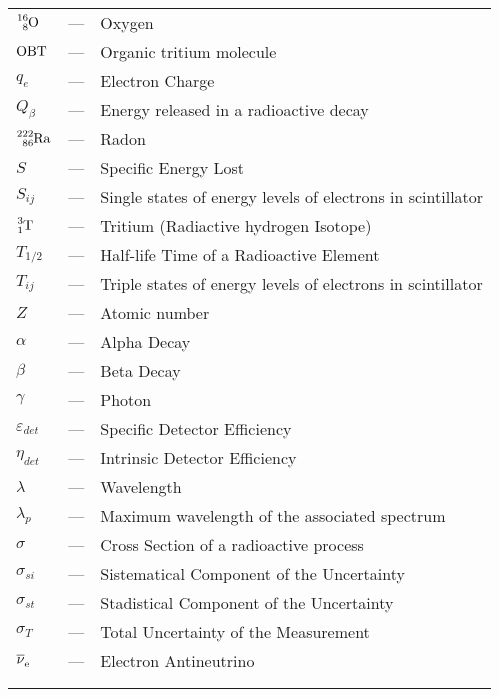 \begin{longtable}{p{25mm} c p{120mm} }
$\ce{^{16}_{8}O}$ & --- & Oxygen\\
$\ce{OBT}$ & --- & Organic tritium molecule\\
$q_{e}$ & --- & Electron Charge\\
$Q_\beta$ & --- & Energy released in a radioactive decay\\
$\ce{^{222}_{86}Ra}$ & --- & Radon\\
$S$ & --- & Specific Energy Lost\\
$S_{ij}$ & --- & Single states of energy levels of electrons in scintillator\\
$\ce{^{3}_{1}T}$ & --- & Tritium (Radiactive hydrogen Isotope)\\
$T_{1/2}$ & --- & Half-life Time of a Radioactive Element\\
$T_{ij}$ & --- & Triple states of energy levels of electrons in scintillator\\
$Z$ & --- & Atomic number\\
$\alpha$ & --- & Alpha Decay\\
$\beta$ & --- & Beta Decay\\
$\gamma$ & --- & Photon\\
$\varepsilon_{det}$ & --- & Specific Detector Efficiency\\
$\eta_{det}$ & --- & Intrinsic Detector Efficiency\\
$\lambda$ & --- & Wavelength\\
$\lambda_p$ & --- & Maximum wavelength of the
\newline associated spectrum\\
$\sigma$ & --- & Cross Section of a radioactive process\\
$\sigma_{si}$ & --- & Sistematical Component of the Uncertainty\\
$\sigma_{st}$ & --- & Stadistical Component of the Uncertainty\\
$\sigma_{T}$ & --- & Total Uncertainty of the Measurement\\
$\ce{\overline{\nu}_e}$ & --- & Electron Antineutrino\\
\\
\\


\end{longtable}
